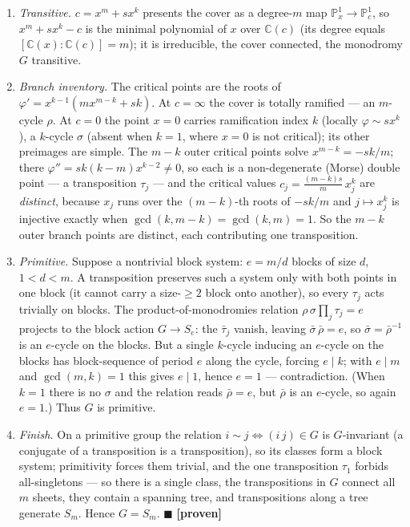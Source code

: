 \documentclass[11pt]{article}
\providecommand{\tightlist}{\setlength{\itemsep}{0pt}\setlength{\parskip}{0pt}}
\theoremstyle{plain}
\theoremstyle{definition}
\theoremstyle{remark}
\begin{document}
\begin{enumerate}
\def\labelenumi{\arabic{enumi}.}
\tightlist
\item
  \emph{Transitive.} \(c = x^m + s x^k\) presents the cover as a degree-\(m\) map \(\mathbb P^1_x\to\mathbb P^1_c\), so \(x^m+sx^k-c\) is the minimal polynomial of \(x\) over \(\mathbb C(c)\) (its degree equals \([\mathbb C(x):\mathbb C(c)]=m\)); it is irreducible, the cover connected, the monodromy \(G\) transitive.
\item
  \emph{Branch inventory.} The critical points are the roots of \(\varphi'=x^{k-1}(m x^{m-k}+sk)\). At \(c=\infty\) the cover is totally ramified --- an \(m\)-cycle \(\rho\). At \(c=0\) the point \(x=0\) carries ramification index \(k\) (locally \(\varphi\sim s x^k\)), a \(k\)-cycle \(\sigma\) (absent when \(k=1\), where \(x=0\) is not critical); its other preimages are simple. The \(m-k\) outer critical points solve \(x^{m-k}=-sk/m\); there \(\varphi''=sk(k-m)x^{k-2}\neq0\), so each is a non-degenerate (Morse) double point --- a transposition \(\tau_j\) --- and the critical values \(c_j=\tfrac{(m-k)s}{m}\,x_j^k\) are \emph{distinct}, because \(x_j\) runs over the \((m-k)\)-th roots of \(-sk/m\) and \(j\mapsto x_j^k\) is injective exactly when \(\gcd(k,m-k)=\gcd(k,m)=1\). So the \(m-k\) outer branch points are distinct, each contributing one transposition.
\item
  \emph{Primitive.} Suppose a nontrivial block system: \(e=m/d\) blocks of size \(d\), \(1<d<m\). A transposition preserves such a system only with both points in one block (it cannot carry a size-\(\ge2\) block onto another), so every \(\tau_j\) acts trivially on blocks. The product-of-monodromies relation \(\rho\,\sigma\prod_j\tau_j=e\) projects to the block action \(G\to S_e\): the \(\bar\tau_j\) vanish, leaving \(\bar\sigma\,\bar\rho=e\), so \(\bar\sigma=\bar\rho^{-1}\) is an \(e\)-cycle on the blocks. But a single \(k\)-cycle inducing an \(e\)-cycle on the blocks has block-sequence of period \(e\) along the cycle, forcing \(e\mid k\); with \(e\mid m\) and \(\gcd(m,k)=1\) this gives \(e\mid 1\), hence \(e=1\) --- contradiction. (When \(k=1\) there is no \(\sigma\) and the relation reads \(\bar\rho=e\), but \(\bar\rho\) is an \(e\)-cycle, so again \(e=1\).) Thus \(G\) is primitive.
\item
  \emph{Finish.} On a primitive group the relation \(i\sim j\iff(i\,j)\in G\) is \(G\)-invariant (a conjugate of a transposition is a transposition), so its classes form a block system; primitivity forces them trivial, and the one transposition \(\tau_1\) forbids all-singletons --- so there is a single class, the transpositions in \(G\) connect all \(m\) sheets, they contain a spanning tree, and transpositions along a tree generate \(S_m\). Hence \(G=S_m\). \(\blacksquare\) \textbf{{[}proven{]}}
\end{enumerate}
\end{document}
